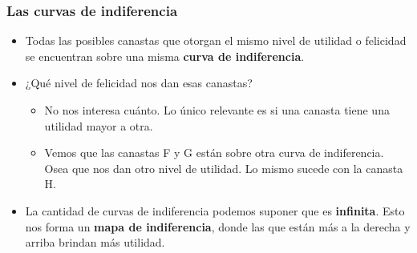 \documentclass{beamer}
\begin{document}
\begin{frame}
\frametitle{Las curvas de indiferencia}
\begin{itemize}
    \item Todas las posibles canastas que otorgan el mismo nivel de utilidad o felicidad se encuentran sobre una misma \textbf{curva de indiferencia}. \vspace{2mm}
    \item ¿Qué nivel de felicidad nos dan esas canastas? 
    \begin{itemize}
    \item No nos interesa cuánto. Lo único relevante es si una canasta tiene una utilidad mayor a otra. 
    \item Vemos que las canastas F y G están sobre otra curva de indiferencia. Osea que nos dan otro nivel de utilidad. Lo mismo sucede con la canasta H. \vspace{1mm}
    \end{itemize} \pause
     \item La cantidad de curvas de indiferencia podemos suponer que es \textbf{infinita}. Esto nos forma un \textbf{mapa de indiferencia}, donde las que están más a la derecha y arriba brindan más utilidad.
    \end{itemize}
\end{frame}
\end{document}

